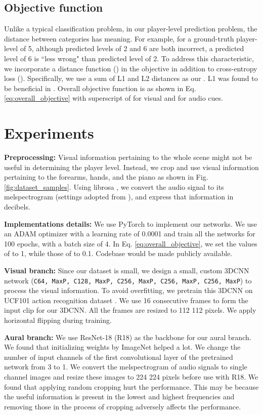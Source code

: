 \documentclass{article}
\begin{document}
\subsection{Objective function}
Unlike a typical classification problem, in our player-level prediction problem, the distance between categories has meaning. For example, for a ground-truth player-level of 5, although predicted levels of 2 and 6 are both incorrect, a predicted level of 6 is ``less wrong" than predicted level of 2. To address this characteristic, we incorporate a distance function () in the objective in addition to cross-entropy loss (). Specifically, we use a sum of L1 and L2 distances as our . L1 was found to be beneficial in \cite{mtlaqa}. Overall objective function is as shown in Eq. \ref{eq:overall_objective} with superscript of  for visual and  for audio cues. 

 \section{Experiments}
\textbf{Preprocessing:} Visual information pertaining to the whole scene might not be useful in determining the player level. Instead, we crop and use visual information pertaining to the forearms, hands, and the piano as shown in Fig. \ref{fig:dataset_samples}. Using librosa \cite{librosa}, we convert the audio signal to its melspectrogram (settings adopted from \cite{hasith}), and express that information in decibels. 

\noindent\textbf{Implementations details:} We use PyTorch \cite{pytorch}  to implement our networks. We use an ADAM optimizer \cite{adam} with a learning rate of 0.0001 and train all the networks for 100 epochs, with a batch size of 4. In Eq. \ref{eq:overall_objective}, we set the values of  to 1, while those of  to 0.1. Codebase would be made publicly available.

\noindent\textbf{Visual branch:} Since our dataset is small, we design a small, custom 3DCNN network (\texttt{C64, MaxP, C128, MaxP, C256, MaxP, C256, MaxP, C256, MaxP}) to process the visual information. To avoid overfitting, we pretrain this 3DCNN on UCF101 action recognition dataset \cite{ucf101}. We use 16 consecutive frames to form the input clip for our 3DCNN. All the frames are resized to 112  112 pixels. We apply horizontal flipping during training.

\noindent\textbf{Aural branch:} We use ResNet-18 (R18) \cite{resnet} as the backbone for our aural branch. We found that initializing weights by ImageNet \cite{imagenet} helped a lot. We change the number of input channels of the first convolutional layer of the pretrained network from 3 to 1. We convert the melspectrogram of audio signals to single channel images and resize these images to 224  224 pixels before use with R18. We found that applying random cropping hurt the performance. This may be because the useful information is present in the lowest and highest frequencies and removing those in the process of cropping adversely affects the performance. 
\end{document}
